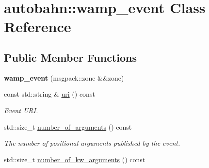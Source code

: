 \hypertarget{classautobahn_1_1wamp__event}{}\section{autobahn\+:\+:wamp\+\_\+event Class Reference}
\label{classautobahn_1_1wamp__event}
\subsection*{Public Member Functions}
\begin{DoxyCompactItemize}
\item 
{\bfseries wamp\+\_\+event} (msgpack\+::zone \&\&zone)\hypertarget{classautobahn_1_1wamp__event_ab439d4d7276111e2db2c211a32013589}{}\label{classautobahn_1_1wamp__event_ab439d4d7276111e2db2c211a32013589}

\item 
const std\+::string \& \hyperlink{classautobahn_1_1wamp__event_a56143766b218b526e7197a21b55eb8d8}{uri} () const 
\begin{DoxyCompactList}\small\item\em Event U\+RI. \end{DoxyCompactList}\item 
std\+::size\+\_\+t \hyperlink{classautobahn_1_1wamp__event_a3f641a0b0c1c4587837e89628cc51120}{number\+\_\+of\+\_\+arguments} () const \hypertarget{classautobahn_1_1wamp__event_a3f641a0b0c1c4587837e89628cc51120}{}\label{classautobahn_1_1wamp__event_a3f641a0b0c1c4587837e89628cc51120}

\begin{DoxyCompactList}\small\item\em The number of positional arguments published by the event. \end{DoxyCompactList}\item 
std\+::size\+\_\+t \hyperlink{classautobahn_1_1wamp__event_a9cbafb7d1e34c12883e724936e2fcce9}{number\+\_\+of\+\_\+kw\+\_\+arguments} () const \hypertarget{classautobahn_1_1wamp__event_a9cbafb7d1e34c12883e724936e2fcce9}{}\label{classautobahn_1_1wamp__event_a9cbafb7d1e34c12883e724936e2fcce9}


\end{DoxyCompactItemize}
